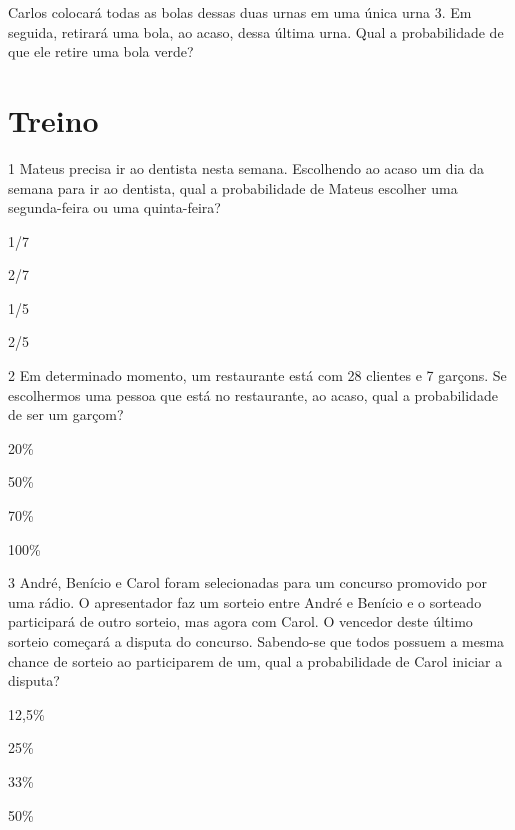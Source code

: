 Carlos colocará todas as bolas dessas duas urnas em uma única urna 3. Em
seguida, retirará uma bola, ao acaso, dessa última urna. Qual a
probabilidade de que ele retire uma bola verde?


\pagebreak
\section*{Treino}

\num{1} Mateus precisa ir ao dentista nesta semana. Escolhendo ao acaso um
dia da semana para ir ao dentista, qual a probabilidade de Mateus
escolher uma segunda-feira ou uma quinta-feira?

\begin{minipage}{.5\textwidth}
\begin{escolha}
\item
  1/7
\item
  2/7
\item
  1/5
\item
  2/5
\end{escolha}
\end{minipage}


\num{2} Em determinado momento, um restaurante está com 28 clientes e 7
garçons. Se escolhermos uma pessoa que está no restaurante, ao acaso,
qual a probabilidade de ser um garçom?

\begin{minipage}{.5\textwidth}
\begin{escolha}
\item
  20\%
\item
  50\%
\item
  70\%
\item
  100\%
\end{escolha}
\end{minipage}


\num{3} André, Benício e Carol foram selecionadas para um
concurso promovido por uma rádio. O apresentador faz um sorteio entre
André e Benício e o sorteado participará de outro sorteio, mas agora com
Carol. O vencedor deste último sorteio começará a disputa do concurso. Sabendo-se
que todos possuem a mesma chance de sorteio ao participarem de um, qual a probabilidade de Carol iniciar a disputa?

\begin{minipage}{.5\textwidth}
\begin{escolha}
\item
  12,5\%
\item
  25\%
\item
  33\%
\item
  50\%
\end{escolha}
\end{minipage}



